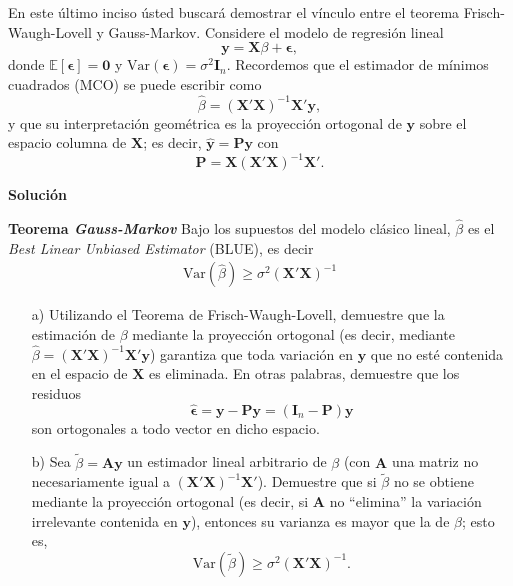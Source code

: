 \documentclass[a4paper, answers, addpoints, 11pt]{exam}
\newenvironment{solucion}{%
  \begin{mdframed}[
    backgroundcolor=blue!5,    %
    linecolor=blue!50,          %
    linewidth=2pt,              %
    leftmargin=10pt,            %
    rightmargin=10pt,           %
    topline=true,              %
    bottomline=true,            %
    roundcorner=10pt,           %
    innerleftmargin=10pt,       %
    innerrightmargin=10pt,      %
    innerbottommargin=10pt,     %
    innertopmargin=10pt         %
  ]%
  \begin{tcolorbox}[colframe=blue!50!black, colback=blue!50, coltitle=white, sharp corners=all, boxrule=1mm, width=\textwidth, halign=left, valign=center, top=0mm, bottom=0mm, left=0mm, right=0mm] \textbf{Solución} \end{tcolorbox} }{\end{mdframed}}
\begin{document}
\begin{enumerate}
    En este último inciso ústed buscará demostrar el vínculo entre el teorema Frisch-Waugh-Lovell y Gauss-Markov. Considere el modelo de regresión lineal
\begin{equation}\label{EQ:modeloGM}
    \mathbf{y} = \mathbf{X}\beta + \boldsymbol\epsilon,
\end{equation}
donde \(\mathbb{E}[\boldsymbol\epsilon] = \mathbf{0}\) y \(\mathrm{Var}(\boldsymbol\epsilon)=\sigma^2 \mathbf{I}_n\). Recordemos que el estimador de mínimos cuadrados (MCO) se puede escribir como
\[
\hat{\beta} = (\mathbf{X}'\mathbf{X})^{-1}\mathbf{X}'\mathbf{y},
\]
y que su interpretación geométrica es la proyección ortogonal de \(\mathbf{y}\) sobre el espacio columna de \(\mathbf{X}\); es decir, \(\hat{\mathbf{y}} = \mathbf{P}\mathbf{y}\) con
\[
\mathbf{P} = \mathbf{X}(\mathbf{X}'\mathbf{X})^{-1}\mathbf{X}'.
\]

\begin{solucion}
\textbf{Teorema \textit{Gauss-Markov}}
Bajo los supuestos del modelo clásico lineal, \(\hat{\beta}\) es el \emph{Best Linear Unbiased Estimator} (BLUE), es decir
\begin{align}
   \text{Var}(\hat{\beta}) \geq \sigma^2 (\mathbf{X}' \mathbf{X})^{-1}    \tag{Gauss-Markov}
\end{align}
\end{solucion}

\begin{itemize}
    \item[a)] Utilizando el Teorema de Frisch-Waugh-Lovell, demuestre que la estimación de \(\beta\) mediante la proyección ortogonal (es decir, mediante \(\hat{\beta} = (\mathbf{X}'\mathbf{X})^{-1}\mathbf{X}'\mathbf{y}\)) garantiza que toda variación en \(\mathbf{y}\) que no esté contenida en el espacio de \(\mathbf{X}\) es eliminada. En otras palabras, demuestre que los residuos
\[
\hat{\boldsymbol\epsilon} = \mathbf{y} - \mathbf{P}\mathbf{y} = (\mathbf{I}_n - \mathbf{P})\mathbf{y}
\]
son ortogonales a todo vector en dicho espacio.


    \item[b)] Sea \(\tilde{\beta} = \mathbf{A}\mathbf{y}\) un estimador lineal arbitrario de \(\beta\) (con \(\mathbf{A}\) una matriz no necesariamente igual a \((\mathbf{X}'\mathbf{X})^{-1}\mathbf{X}'\)). Demuestre que si \(\tilde{\beta}\) no se obtiene mediante la proyección ortogonal (es decir, si \(\mathbf{A}\) no ``elimina'' la variación irrelevante contenida en \(\mathbf{y}\)), entonces su varianza es mayor que la de \(\hat{\beta}\); esto es,
\[
\mathrm{Var}(\tilde{\beta}) \geq \sigma^2 (\mathbf{X}'\mathbf{X})^{-1}.
\]


\end{itemize}
\end{enumerate}
\end{document}
